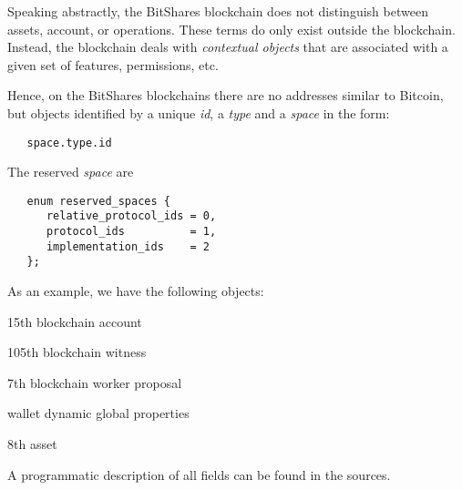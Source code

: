 Speaking abstractly, the BitShares blockchain does not distinguish between
assets, account, or operations. These terms do only exist outside the
blockchain. Instead, the blockchain deals with \emph{contextual objects} that
are associated with a given set of features, permissions, etc.

Hence, on the BitShares blockchains there are no addresses similar to Bitcoin,
but objects identified by a unique \emph{id}, a \emph{type} and a \emph{space}
in the form:

\begin{verbatim}
   space.type.id
\end{verbatim}

The reserved \emph{space} are
\begin{verbatim}
   enum reserved_spaces {
      relative_protocol_ids = 0,
      protocol_ids          = 1,
      implementation_ids    = 2
   };
\end{verbatim}

As an example, we have the following objects:
\begin{description}[leftmargin=4em,style=nextline]
 \item[1.2.15]   15th blockchain account
 \item[1.6.105]  105th blockchain witness
 \item[1.14.7]   7th blockchain worker proposal
 \item[2.1.0]    wallet dynamic global properties
 \item[2.3.8]    8th asset
\end{description}

A programmatic description of all fields can be found in the sources.

